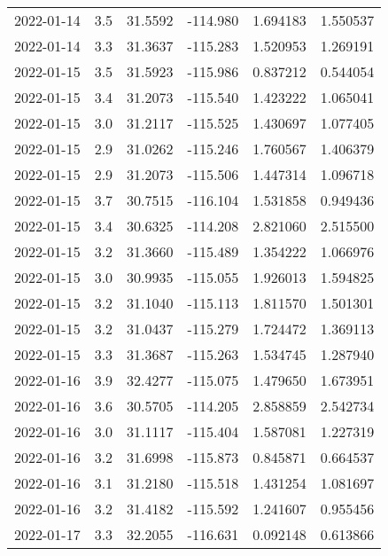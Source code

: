 \begin{tabular}{lrrrrr}
2022-01-14 &       3.5 &  31.5592 &  -114.980 &         1.694183 &         1.550537 \\
2022-01-14 &       3.3 &  31.3637 &  -115.283 &         1.520953 &         1.269191 \\
2022-01-15 &       3.5 &  31.5923 &  -115.986 &         0.837212 &         0.544054 \\
2022-01-15 &       3.4 &  31.2073 &  -115.540 &         1.423222 &         1.065041 \\
2022-01-15 &       3.0 &  31.2117 &  -115.525 &         1.430697 &         1.077405 \\
2022-01-15 &       2.9 &  31.0262 &  -115.246 &         1.760567 &         1.406379 \\
2022-01-15 &       2.9 &  31.2073 &  -115.506 &         1.447314 &         1.096718 \\
2022-01-15 &       3.7 &  30.7515 &  -116.104 &         1.531858 &         0.949436 \\
2022-01-15 &       3.4 &  30.6325 &  -114.208 &         2.821060 &         2.515500 \\
2022-01-15 &       3.2 &  31.3660 &  -115.489 &         1.354222 &         1.066976 \\
2022-01-15 &       3.0 &  30.9935 &  -115.055 &         1.926013 &         1.594825 \\
2022-01-15 &       3.2 &  31.1040 &  -115.113 &         1.811570 &         1.501301 \\
2022-01-15 &       3.2 &  31.0437 &  -115.279 &         1.724472 &         1.369113 \\
2022-01-15 &       3.3 &  31.3687 &  -115.263 &         1.534745 &         1.287940 \\
2022-01-16 &       3.9 &  32.4277 &  -115.075 &         1.479650 &         1.673951 \\
2022-01-16 &       3.6 &  30.5705 &  -114.205 &         2.858859 &         2.542734 \\
2022-01-16 &       3.0 &  31.1117 &  -115.404 &         1.587081 &         1.227319 \\
2022-01-16 &       3.2 &  31.6998 &  -115.873 &         0.845871 &         0.664537 \\
2022-01-16 &       3.1 &  31.2180 &  -115.518 &         1.431254 &         1.081697 \\
2022-01-16 &       3.2 &  31.4182 &  -115.592 &         1.241607 &         0.955456 \\
2022-01-17 &       3.3 &  32.2055 &  -116.631 &         0.092148 &         0.613866 \\

\end{tabular}
